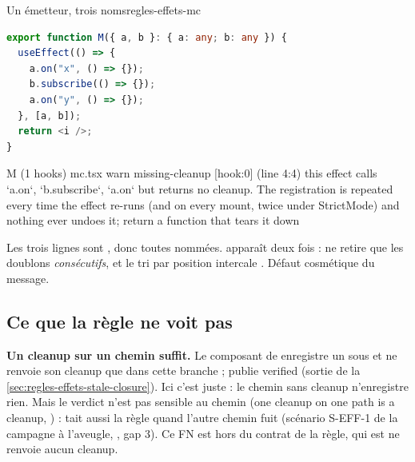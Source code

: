 \begin{exemple}{Un émetteur, trois noms}{regles-effets-mc}
\begin{lstlisting}[language=TypeScript]
export function M({ a, b }: { a: any; b: any }) {
  useEffect(() => {
    a.on("x", () => {});
    b.subscribe(() => {});
    a.on("y", () => {});
  }, [a, b]);
  return <i />;
}
\end{lstlisting}
\begin{sortie}
  M  (1 hooks)  mc.tsx
    warn   missing-cleanup  [hook:0]  (line 4:4)  this effect calls `a.on`, `b.subscribe`, `a.on` but returns no cleanup. The registration is repeated every time the effect re-runs (and on every mount, twice under StrictMode) and nothing ever undoes it; return a function that tears it down
\end{sortie}
Les trois lignes sont , donc toutes nommées.  apparaît deux fois :  ne retire que les doublons \emph{consécutifs}, et le tri par position intercale . Défaut cosmétique du message.
\end{exemple}

\subsection{Ce que la règle ne voit pas}

\begin{piege}
\textbf{Un cleanup sur un chemin suffit.} Le composant  de  enregistre un  sous  et ne renvoie son cleanup que dans cette branche ;  publie \og verified\fg{} (sortie de la \cref{sec:regles-effets-stale-closure}). Ici c'est juste : le chemin sans cleanup n'enregistre rien. Mais le verdict n'est pas sensible au chemin (\og one cleanup on one path is a cleanup\fg{}, ) :  tait aussi la règle quand l'autre chemin fuit (scénario S-EFF-1 de la campagne à l'aveugle, , gap 3). Ce FN est hors du contrat de la règle, qui est \og ne renvoie aucun cleanup\fg{}.
\end{piege}

